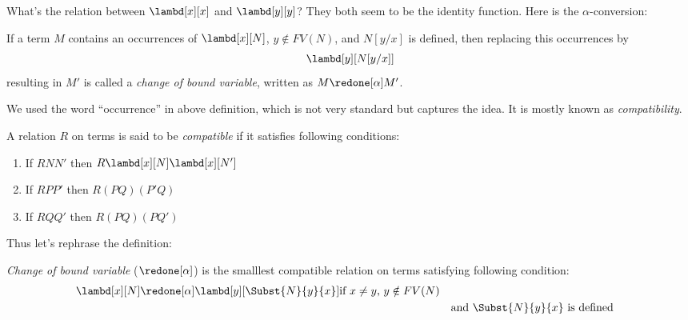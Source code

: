 \documentclass[../../../include/open-logic-section]{subfiles}
\begin{document}

What's the relation between $\lambd[x][x]$ and $\lambd[y][y]$? They
both seem to be the identity function. Here is the $\alpha$-conversion:

\begin{defn}
  If a term $M$ contains an occurrences of $\lambd[x][N]$, $y \notin
  FV(N)$, and $N[y/x]$ is defined, then replacing this occurrences
  by 
  \begin{equation*}
    \lambd[y][N[y/x]]
  \end{equation*}
  resulting in $M'$ is called a \emph{change of bound variable}, written
  as $M \redone[\alpha] M'$.
\end{defn}


We used the word ``occurrence'' in above definition, which is not very
standard but captures the idea. It is mostly known as
\emph{compatibility}. 
\begin{defn}
  A relation $R$ on terms is said to be \emph{compatible}
  if it satisfies following conditions:
  \begin{enumerate}
  \item If $R N N'$ then $R \lambd[x][N] \lambd[x][N']$
  \item If $R P P'$ then $R (PQ) (P'Q)$
  \item If $R Q Q'$ then $R (PQ) (PQ')$
  \end{enumerate}
\end{defn}

Thus let's rephrase the definition:
\begin{defn}
  \emph{Change of bound variable} ($\redone[\alpha]$) is 
  the smalllest compatible relation on terms satisfying following
  condition:
  \begin{align*}
    &\lambd[x][N] \redone[\alpha] \lambd[y][\Subst{N}{y}{x}] \text{if
      $x \neq y$, $y \notin FV(N)$} \\
    & &&\text{and $\Subst{N}{y}{x}$ is defined}
  \end{align*}
\end{defn}
\end{document}

